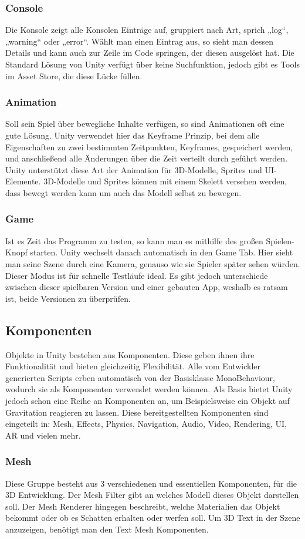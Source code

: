 \subsubsection{Console}
Die Konsole zeigt alle Konsolen Einträge auf, gruppiert nach Art, sprich „log“, „warning“ oder „error“. Wählt man einen Eintrag aus, so sieht man dessen Details und kann auch zur Zeile im Code springen, der diesen ausgelöst hat. Die Standard Lösung von Unity verfügt über keine Suchfunktion, jedoch gibt es Tools im Asset Store, die diese Lücke füllen.
\subsubsection{Animation}
Soll sein Spiel über bewegliche Inhalte verfügen, so sind Animationen oft eine gute Lösung. Unity verwendet hier das Keyframe Prinzip, bei dem alle Eigenschaften zu zwei bestimmten Zeitpunkten, Keyframes, gespeichert werden, und anschließend alle Änderungen über die Zeit verteilt durch geführt werden. Unity unterstützt diese Art der Animation für 3D-Modelle, Sprites und UI-Elemente. 3D-Modelle und Sprites können mit einem Skelett versehen werden, dass bewegt werden kann um auch das Modell selbst zu bewegen.
\subsubsection{Game}
Ist es Zeit das Programm zu testen, so kann man es mithilfe des großen Spielen-Knopf starten. Unity wechselt danach automatisch in den Game Tab. Hier sieht man seine Szene durch eine Kamera, genauso wie sie Spieler später sehen würden. Dieser Modus ist für schnelle Testläufe ideal. Es gibt jedoch unterschiede zwischen dieser spielbaren Version und einer gebauten App, weshalb es ratsam ist, beide Versionen zu überprüfen.
\subsection{Komponenten}
Objekte in Unity bestehen aus Komponenten. Diese geben ihnen ihre Funktionalität und bieten gleichzeitig Flexibilität. Alle vom Entwickler generierten Scripts erben automatisch von der Basisklasse MonoBehaviour, wodurch sie als Komponenten verwendet werden können. Als Basis bietet Unity jedoch schon eine Reihe an Komponenten an, um Beispielsweise ein Objekt auf Gravitation reagieren zu lassen. Diese bereitgestellten Komponenten sind eingeteilt in: Mesh, Effects, Physics, Navigation, Audio, Video, Rendering, UI, AR und vielen mehr.
\subsubsection{Mesh}
Diese Gruppe besteht aus 3 verschiedenen und essentiellen Komponenten, für die 3D Entwicklung. Der Mesh Filter gibt an welches Modell dieses Objekt darstellen soll. Der Mesh Renderer hingegen beschreibt, welche Materialien das Objekt bekommt oder ob es Schatten erhalten oder werfen soll. Um 3D Text in der Szene anzuzeigen, benötigt man den Text Mesh Komponenten.
